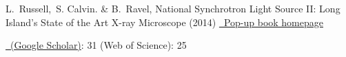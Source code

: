 \documentclass[11pt]{moderncv}
\begin{document}
%
{\small L.\ Russell,\ S. Calvin. \& B.\ Ravel, National Synchrotron
  Light Source II: Long Island's State of the Art X-ray Microscope
  (2014)
  \href{http://bruceravel.github.io/synchrotron_pop_up_book/}
  {\color{color2}\homepagesymbol~Pop-up book homepage}}

%
{\small \href{http://scholar.google.com/citations?user=41rV5koAAAAJ}
  {\color{color2}\homepagesymbol~(Google Scholar)}: 31 \qquad
  (Web of Science): 25}

\nocite{*}


\end{document}
